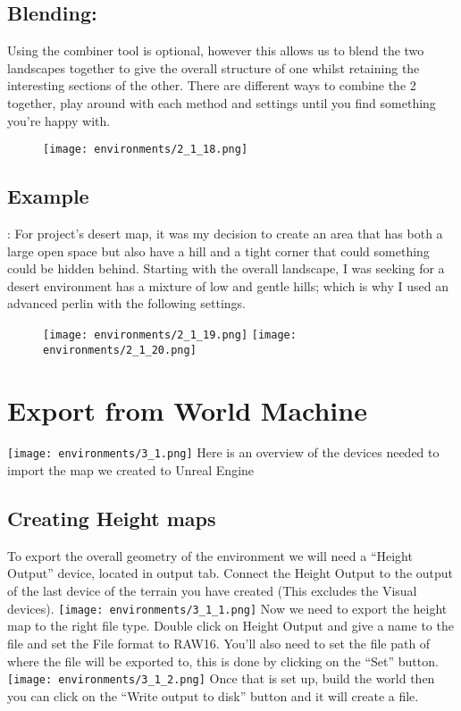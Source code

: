 \documentclass[../main.tex]{subfiles}
\begin{document}
\subsection{Blending:}
Using the combiner tool is optional, however this allows us to blend the two landscapes together to give the overall structure of one whilst retaining the interesting sections of the other.
There are different ways to combine the 2 together, play around with each method and settings until you find something you’re happy with.
\begin{figure}[H]
\texttt{[image: environments/2\_1\_18.png]}
\end{figure}

\subsection{Example}:
For project’s desert map, it was my decision to create an area that has both a large open space but also have a hill and a tight corner that could something could be hidden behind.
Starting with the overall landscape, I was seeking for a desert environment has a mixture of low and gentle hills; which is why I used an advanced perlin with the following settings.
\begin{figure}[H]
\texttt{[image: environments/2\_1\_19.png]}
\texttt{[image: environments/2\_1\_20.png]}
\end{figure}
\section{Export from World Machine}
\texttt{[image: environments/3\_1.png]}
Here is an overview of the devices needed to import the map we created to Unreal Engine

\subsection{Creating Height maps}
To export the overall geometry of the environment we will need a “Height Output” device, located in output tab. Connect the Height Output to the output of the last device of the terrain you have created (This excludes the Visual devices).
 \texttt{[image: environments/3\_1\_1.png]}
Now we need to export the height map to the right file type. Double click on Height Output and give a name to the file and set the File format to RAW16. You’ll also need to set the file path of where the file will be exported to, this is done by clicking on the “Set” button.
\texttt{[image: environments/3\_1\_2.png]}
Once that is set up, build the world then you can click on the “Write output to disk” button and it will create a file.
\end{document}
